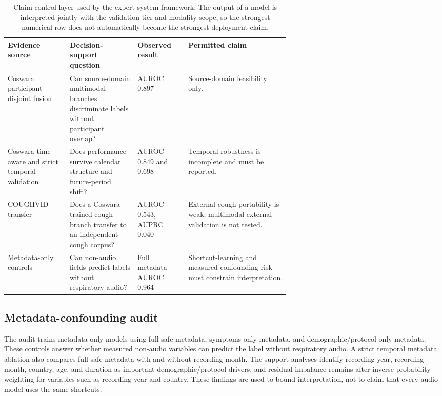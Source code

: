 \documentclass[preprint,12pt]{elsarticle}
\begin{document}
\begin{table}[t]
\centering
\caption{Claim-control layer used by the expert-system framework. The output of a model is interpreted jointly with the validation tier and modality scope, so the strongest numerical row does not automatically become the strongest deployment claim.}
\label{tab:claim-control}
\scriptsize
\setlength{\tabcolsep}{2.5pt}
\begin{tabularx}{\linewidth}{p{0.22\linewidth} p{0.24\linewidth} p{0.18\linewidth} X}
\toprule
Evidence source & Decision-support question & Observed result & Permitted claim \\
\midrule
Coswara participant-disjoint fusion & Can source-domain multimodal branches discriminate labels without participant overlap? & AUROC 0.897 & Source-domain feasibility only. \\
Coswara time-aware and strict temporal validation & Does performance survive calendar structure and future-period shift? & AUROC 0.849 and 0.698 & Temporal robustness is incomplete and must be reported. \\
COUGHVID transfer & Does a Coswara-trained cough branch transfer to an independent cough corpus? & AUROC 0.543, AUPRC 0.040 & External cough portability is weak; multimodal external validation is not tested. \\
Metadata-only controls & Can non-audio fields predict labels without respiratory audio? & Full metadata AUROC 0.964 & Shortcut-learning and measured-confounding risk must constrain interpretation. \\
\bottomrule
\end{tabularx}
\end{table}

\subsection{Metadata-confounding audit}

The audit trains metadata-only models using full safe metadata, symptoms-only metadata, and demographic/protocol-only metadata. These controls answer whether measured non-audio variables can predict the label without respiratory audio. A strict temporal metadata ablation also compares full safe metadata with and without recording month. The support analyses identify recording year, recording month, country, age, and duration as important demographic/protocol drivers, and residual imbalance remains after inverse-probability weighting for variables such as recording year and country. These findings are used to bound interpretation, not to claim that every audio model uses the same shortcuts.
\end{document}
